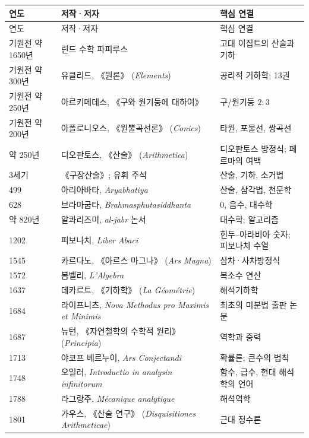 \begin{center}
\footnotesize
\renewcommand{\arraystretch}{1.07}
\begin{longtable}{@{}L{0.15\textwidth}L{0.31\textwidth}L{0.46\textwidth}@{}}
\toprule
연도 & 저작·저자 & 핵심 연결\\
\midrule
\endfirsthead
\toprule 연도 & 저작·저자 & 핵심 연결\\ \midrule \endhead
\bottomrule\endlastfoot
기원전 약 1650년 & 린드 수학 파피루스 & 고대 이집트의 산술과 기하\\
기원전 약 300년 & 유클리드, 《원론》 (\textit{Elements}) & 공리적 기하학; 13권\\
기원전 약 250년 & 아르키메데스, 《구와 원기둥에 대하여》 & 구/원기둥 $2:3$\\
기원전 약 200년 & 아폴로니오스, 《원뿔곡선론》 (\textit{Conics}) & 타원, 포물선, 쌍곡선\\
약 250년 & 디오판토스, 《산술》 (\textit{Arithmetica}) & 디오판토스 방정식; 페르마의 여백\\
3세기 & 《구장산술》; 유휘 주석 & 산술, 기하, 소거법\\
499 & 아리아바타, \textit{Aryabhatiya} & 산술, 삼각법, 천문학\\
628 & 브라마굽타, \textit{Brahmasphutasiddhanta} & 0, 음수, 대수학\\
약 820년 & 알콰리즈미, \textit{al-jabr} 논서 & 대수학; 알고리즘\\
1202 & 피보나치, \textit{Liber Abaci} & 힌두--아라비아 숫자; 피보나치 수열\\
1545 & 카르다노, 《아르스 마그나》 (\textit{Ars Magna}) & 삼차·사차방정식\\
1572 & 봄벨리, \textit{L'Algebra} & 복소수 연산\\
1637 & 데카르트, 《기하학》 (\textit{La Géométrie}) & 해석기하학\\
1684 & 라이프니츠, \textit{Nova Methodus pro Maximis et Minimis} & 최초의 미분법 출판 논문\\
1687 & 뉴턴, 《자연철학의 수학적 원리》 (\textit{Principia}) & 역학과 중력\\
1713 & 야코프 베르누이, \textit{Ars Conjectandi} & 확률론; 큰수의 법칙\\
1748 & 오일러, \textit{Introductio in analysin infinitorum} & 함수, 급수, 현대 해석학의 언어\\
1788 & 라그랑주, \textit{Mécanique analytique} & 해석역학\\
1801 & 가우스, 《산술 연구》 (\textit{Disquisitiones Arithmeticae}) & 근대 정수론\\

\end{longtable}
\end{center}

